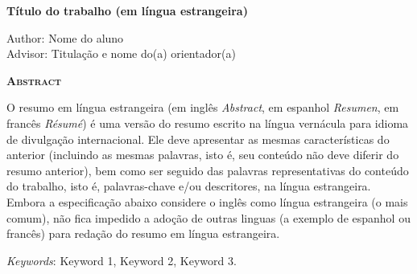 \begin{center}
	{\Large{\textbf{Título do trabalho (em língua estrangeira)}}}
\end{center}

\vspace{1cm}

\begin{flushright}
	Author: Nome do aluno\\
	Advisor: Titulação e nome do(a) orientador(a)
\end{flushright}

\vspace{1cm}

\begin{center}
	\Large{\textsc{\textbf{Abstract}}}
\end{center}

\noindent O resumo em língua estrangeira (em inglês \textit{Abstract}, em espanhol \textit{Resumen}, em francês \textit{Résumé}) é uma versão do resumo escrito na língua vernácula para idioma de divulgação internacional. Ele deve apresentar as mesmas características do anterior (incluindo as mesmas palavras, isto é, seu conteúdo não deve diferir do resumo anterior), bem como ser seguido das palavras representativas do conteúdo do trabalho, isto é, palavras-chave e/ou descritores, na língua estrangeira. Embora a especificação abaixo considere o inglês como língua estrangeira (o mais comum), não fica impedido a adoção de outras linguas (a exemplo de espanhol ou francês) para redação do resumo em língua estrangeira.

\noindent\textit{Keywords}: Keyword 1, Keyword 2, Keyword 3.